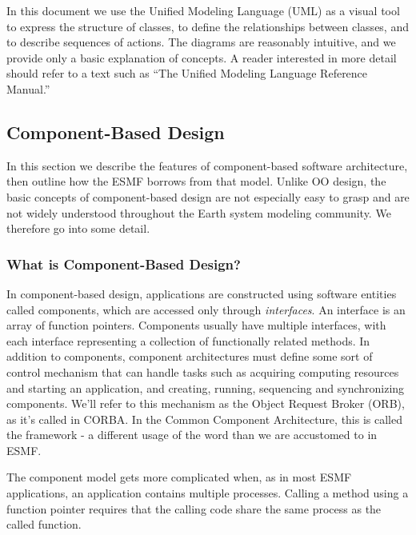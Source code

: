 In this document we use the Unified Modeling Language (UML) as a visual tool 
to express the structure of 
classes, to define the relationships between classes, and to describe sequences
of actions.  The diagrams are reasonably intuitive, and we provide 
only a basic explanation of concepts.  A reader interested in more detail should 
refer to a text such as ``The Unified Modeling Language Reference Manual.''

\subsection{Component-Based Design}

In this section we describe the features of component-based software 
architecture, then outline how the ESMF borrows from that model.  Unlike
OO design, the basic concepts of component-based design are not especially
easy to grasp and are not widely understood throughout the Earth system 
modeling community.  We therefore go into some detail.

\subsubsection{What is Component-Based Design?}

In component-based design, applications are constructed using software entities 
called components, which are accessed only through {\it interfaces}.  
An interface is an array of function pointers.  Components usually have multiple 
interfaces, with each interface representing a collection of functionally 
related methods.  In addition to components, component 
architectures must define some sort of control mechanism that can handle tasks 
such as acquiring computing resources and starting an application, 
and creating, running, sequencing and synchronizing components.  We'll refer to
this mechanism as the Object Request Broker (ORB), as it's called in CORBA.  In the 
Common Component Architecture, this is called the framework - a different usage
of the word than we are accustomed to in ESMF.

The component model gets more complicated when, as in most ESMF applications, 
an application contains multiple processes.  Calling a 
method using a function pointer requires that the calling code share the 
same process as the called function.  

